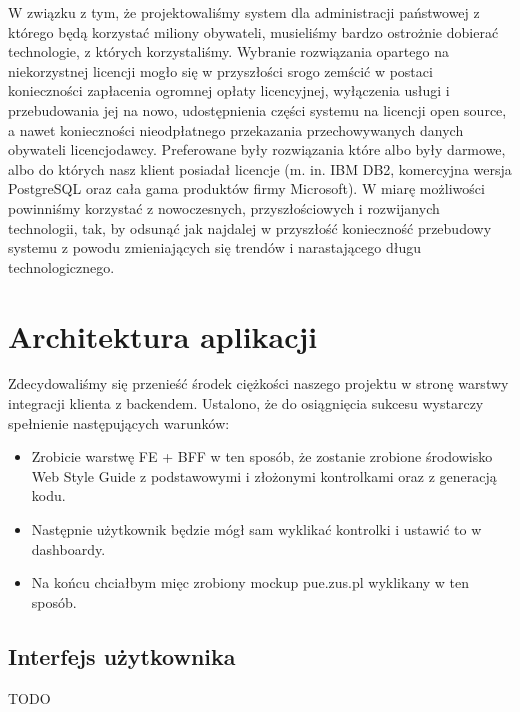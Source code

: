 \documentclass[licencjacka]{pracamgr}
\begin{document}
W związku z tym, że projektowaliśmy system dla administracji państwowej z którego będą korzystać miliony obywateli,
musieliśmy bardzo ostrożnie dobierać technologie, z których korzystaliśmy. Wybranie rozwiązania opartego na
niekorzystnej licencji mogło się w przyszłości srogo zemścić w postaci konieczności zapłacenia ogromnej opłaty
licencyjnej, wyłączenia usługi i przebudowania jej na nowo, udostępnienia części systemu na licencji open source, a
nawet konieczności nieodpłatnego przekazania przechowywanych danych obywateli licencjodawcy. Preferowane były
rozwiązania które albo były darmowe, albo do których nasz klient posiadał licencje (m. in. IBM DB2, komercyjna wersja PostgreSQL oraz cała gama produktów firmy Microsoft). W miarę możliwości
powinniśmy korzystać z nowoczesnych, przyszłościowych i rozwijanych technologii, tak, by odsunąć jak najdalej w
przyszłość konieczność przebudowy systemu z powodu zmieniających się trendów i narastającego długu technologicznego.


\chapter{Architektura aplikacji}

Zdecydowaliśmy się przenieść środek ciężkości naszego projektu w stronę warstwy integracji klienta z backendem. Ustalono, że do osiągnięcia sukcesu wystarczy spełnienie następujących warunków: %
\begin{itemize}
	\item Zrobicie warstwę FE + BFF w ten sposób, że zostanie zrobione środowisko Web Style Guide z podstawowymi i złożonymi kontrolkami oraz z generacją kodu.
	\item Następnie użytkownik będzie mógł sam wyklikać kontrolki i ustawić to w dashboardy.
	\item Na końcu chciałbym mięc zrobiony mockup pue.zus.pl wyklikany w ten sposób.
\end{itemize}

\section{Interfejs użytkownika}
TODO
\end{document}
